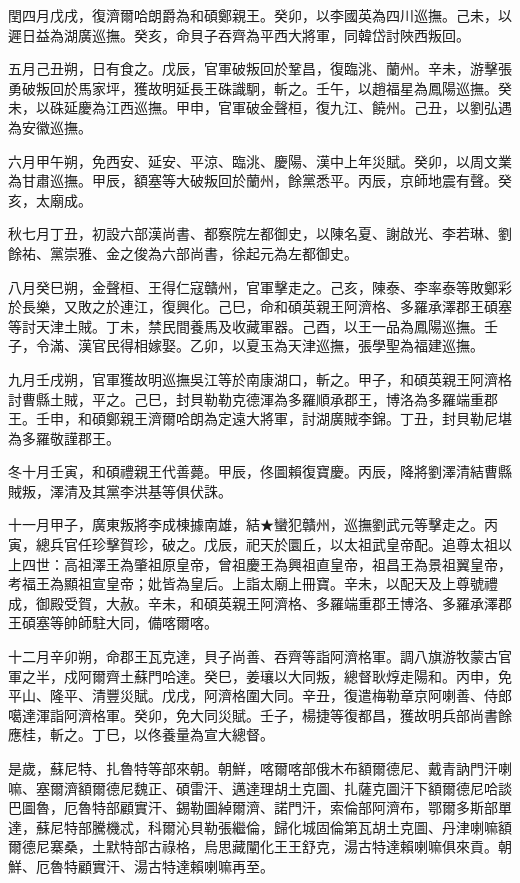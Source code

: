 \begin{pinyinscope}
閏四月戊戌，復濟爾哈朗爵為和碩鄭親王。癸卯，以李國英為四川巡撫。己未，以遲日益為湖廣巡撫。癸亥，命貝子吞齊為平西大將軍，同韓岱討陜西叛回。

五月己丑朔，日有食之。戊辰，官軍破叛回於鞏昌，復臨洮、蘭州。辛未，游擊張勇破叛回於馬家坪，獲故明延長王硃識駉，斬之。壬午，以趙福星為鳳陽巡撫。癸未，以硃延慶為江西巡撫。甲申，官軍破金聲桓，復九江、饒州。己丑，以劉弘遇為安徽巡撫。

六月甲午朔，免西安、延安、平涼、臨洮、慶陽、漢中上年災賦。癸卯，以周文業為甘肅巡撫。甲辰，額塞等大破叛回於蘭州，餘黨悉平。丙辰，京師地震有聲。癸亥，太廟成。

秋七月丁丑，初設六部漢尚書、都察院左都御史，以陳名夏、謝啟光、李若琳、劉餘祐、黨崇雅、金之俊為六部尚書，徐起元為左都御史。

八月癸巳朔，金聲桓、王得仁寇贛州，官軍擊走之。己亥，陳泰、李率泰等敗鄭彩於長樂，又敗之於連江，復興化。己巳，命和碩英親王阿濟格、多羅承澤郡王碩塞等討天津土賊。丁未，禁民間養馬及收藏軍器。己酉，以王一品為鳳陽巡撫。壬子，令滿、漢官民得相嫁娶。乙卯，以夏玉為天津巡撫，張學聖為福建巡撫。

九月壬戌朔，官軍獲故明巡撫吳江等於南康湖口，斬之。甲子，和碩英親王阿濟格討曹縣土賊，平之。己巳，封貝勒勒克德渾為多羅順承郡王，博洛為多羅端重郡王。壬申，和碩鄭親王濟爾哈朗為定遠大將軍，討湖廣賊李錦。丁丑，封貝勒尼堪為多羅敬謹郡王。

冬十月壬寅，和碩禮親王代善薨。甲辰，佟圖賴復寶慶。丙辰，降將劉澤清結曹縣賊叛，澤清及其黨李洪基等俱伏誅。

十一月甲子，廣東叛將李成棟據南雄，結★蠻犯贛州，巡撫劉武元等擊走之。丙寅，總兵官任珍擊賀珍，破之。戊辰，祀天於圜丘，以太祖武皇帝配。追尊太祖以上四世：高祖澤王為肇祖原皇帝，曾祖慶王為興祖直皇帝，祖昌王為景祖翼皇帝，考福王為顯祖宣皇帝；妣皆為皇后。上詣太廟上冊寶。辛未，以配天及上尊號禮成，御殿受賀，大赦。辛未，和碩英親王阿濟格、多羅端重郡王博洛、多羅承澤郡王碩塞等帥師駐大同，備喀爾喀。

十二月辛卯朔，命郡王瓦克達，貝子尚善、吞齊等詣阿濟格軍。調八旗游牧蒙古官軍之半，戍阿爾齊土蘇門哈達。癸巳，姜瓖以大同叛，總督耿焞走陽和。丙申，免平山、隆平、清豐災賦。戊戌，阿濟格圍大同。辛丑，復遣梅勒章京阿喇善、侍郎噶達渾詣阿濟格軍。癸卯，免大同災賦。壬子，楊捷等復都昌，獲故明兵部尚書餘應桂，斬之。丁巳，以佟養量為宣大總督。

是歲，蘇尼特、扎魯特等部來朝。朝鮮，喀爾喀部俄木布額爾德尼、戴青訥門汗喇嘛、塞爾濟額爾德尼魏正、碩雷汗、邁達理胡土克圖、扎薩克圖汗下額爾德尼哈談巴圖魯，厄魯特部顧實汗、錫勒圖綽爾濟、諾門汗，索倫部阿濟布，鄂爾多斯部單達，蘇尼特部騰機忒，科爾沁貝勒張繼倫，歸化城固倫第瓦胡土克圖、丹津喇嘛額爾德尼寨桑，土默特部古祿格，烏思藏闡化王王舒克，湯古特達賴喇嘛俱來貢。朝鮮、厄魯特顧實汗、湯古特達賴喇嘛再至。


\end{pinyinscope}
